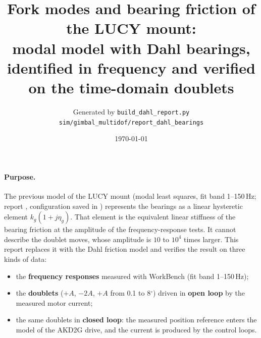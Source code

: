 \documentclass[10pt,a4paper]{article}
\title{Fork modes and bearing friction of the LUCY mount:\\ modal model with Dahl bearings, identified in frequency and verified on the time-domain doublets}
\author{Generated by \texttt{build\_dahl\_report.py}\\ \small\texttt{sim/gimbal\_multidof/report\_dahl\_bearings}}
\date{\today}
\numberwithin{equation}{section}
\begin{document}
\maketitle

\paragraph{Purpose.} The previous model of the LUCY mount (modal least squares, fit band 1--150\,Hz; report , configuration saved in ) represents the bearings as a linear hysteretic element $k_g(1+j\eta_g)$. That element is the equivalent linear stiffness of the bearing friction at the amplitude of the frequency-response tests. It cannot describe the doublet moves, whose amplitude is $10$ to $10^4$ times larger. This report replaces it with the Dahl friction model and verifies the result on three kinds of data:
\begin{itemize}
\item the \textbf{frequency responses} measured with WorkBench (fit band 1--150\,Hz);
\item the \textbf{doublets} ($+A$, $-2A$, $+A$ from 0.1 to 8$^\circ$) driven in \textbf{open loop} by the measured motor current;
\item the same doublets in \textbf{closed loop}: the measured position reference enters the model of the AKD2G drive, and the current is produced by the control loops.
\end{itemize}
\end{document}
